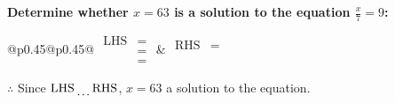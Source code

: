 \documentclass[12pt, varwidth, border=5mm]{standalone}
\begin{document}
    \noindent \textbf{Determine whether \(x = 63\) is a solution to the equation \(\frac{x}{7} = 9\):}
\vspace{2pt}  %

\noindent
\renewcommand{\arraystretch}{1.3} %
\begin{tabular}{@{}p{0.45\linewidth}@{}p{0.45\linewidth}@{}}
    \(\begin{aligned}
        \text{LHS} &=  \\
                   &=  \\
                   &=
    \end{aligned}\) &
    \(\begin{aligned}
        \text{RHS} &= \\
                   & \\
                   &
    \end{aligned}\)
\end{tabular}
\renewcommand{\arraystretch}{1.0} %
\vspace{2pt}  %

\noindent \(\therefore\) Since \(\text{LHS} \dotuline{\hspace{5mm}} \text{RHS}\), \(x = 63\) \dotuline{\hspace{12mm}} a solution to the equation.
\end{document}

